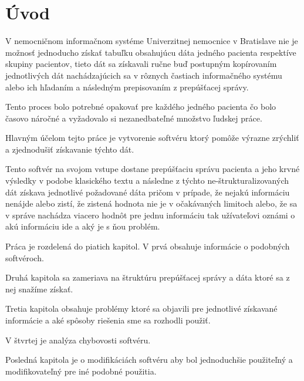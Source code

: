 \chapter*{Úvod} %

V nemocničnom informačnom systéme Univerzitnej nemocnice v Bratislave nie je možnosť jednoducho získať tabuľku obsahujúcu dáta jedného pacienta respektíve skupiny pacientov, tieto dát sa získavali ručne buď postupným kopírovaním jednotlivých dát nachádzajúcich sa v rôznych častiach informačného systému alebo ich hľadaním a následným prepisovaním z prepúšťacej správy.

Tento proces bolo potrebné opakovať pre každého jedného pacienta čo bolo časovo náročné a vyžadovalo si nezanedbateľné množstvo ľudskej práce.

Hlavným účelom tejto práce je vytvorenie softvéru ktorý pomôže výrazne zrýchliť a zjednodušiť získavanie týchto dát.

Tento softvér na svojom vstupe dostane prepúšťaciu správu pacienta a jeho krvné výsledky v podobe klasického textu a následne z týchto ne-štrukturalizovaných dát získava jednotlivé požadované dáta pričom v prípade, že nejakú informáciu nenájde alebo zistí, že zistená hodnota nie je v očakávaných limitoch alebo, že sa v správe nachádza viacero hodnôt pre jednu informáciu tak užívateľovi oznámi o akú informáciu ide a aký je s ňou problém. 

Práca je rozdelená do piatich kapitol. V prvá obsahuje informácie o podobných softvéroch.

Druhá kapitola sa zameriava na štruktúru prepúšťacej správy a dáta ktoré sa z nej snažíme získať.

Tretia kapitola obsahuje problémy ktoré sa objavili pre jednotlivé získavané informácie a aké spôsoby riešenia sme sa rozhodli použiť.

V štvrtej je analýza chybovosti softvéru.

Posledná kapitola je o modifikáciách softvéru aby bol jednoduchšie použiteľný a modifikovateľný pre iné podobné použitia. 




